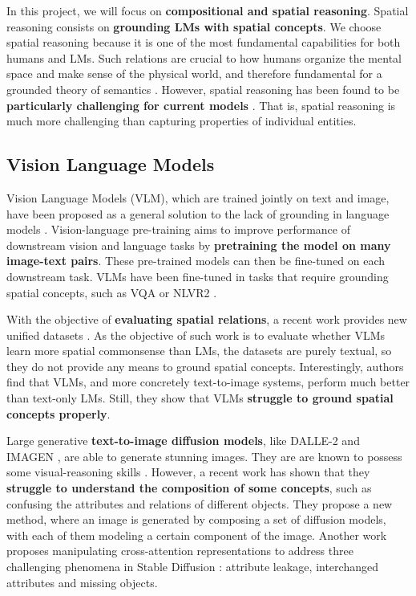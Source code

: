 In this project, we will focus on \textbf{compositional and spatial reasoning}. Spatial reasoning consists on \textbf{grounding LMs with spatial concepts}. We choose spatial reasoning because it is one of the most fundamental capabilities for both humans and LMs. Such relations are crucial to how humans organize the mental space and make sense of the physical world, and therefore fundamental for a grounded theory of semantics \cite{levinson2003space}. However, spatial reasoning has been found to be \textbf{particularly challenging for current models} \cite{akula2020words}. That is, spatial reasoning is much more challenging than capturing properties of individual entities.

\subsection{Vision Language Models} \label{sec:vision_language_models}

Vision Language Models (VLM), which are trained jointly on text and image, have been proposed as a general solution to the lack of grounding in language models \cite{lu2019vilbert, tan2020lxmert, ramesh2022hierarchical, saharia2022photorealistic}. Vision-language pre-training aims to improve performance of downstream vision and language tasks by \textbf{pretraining the model on many image-text pairs}. These pre-trained models can then be fine-tuned on each downstream task. VLMs have been fine-tuned in tasks that require grounding spatial concepts, such as VQA \cite{antol2015vqa} or NLVR2 \cite{suhr2018corpus}.

With the objective of \textbf{evaluating spatial relations}, a recent work provides new unified datasets \cite{liu2022things}. As the objective of such work is to evaluate whether VLMs learn more spatial commonsense than LMs, the datasets are purely textual, so they do not provide any means to ground spatial concepts. Interestingly, authors find that VLMs, and more concretely text-to-image systems, perform much better than text-only LMs. Still, they show that VLMs \textbf{struggle to ground spatial concepts properly}.

Large generative \textbf{text-to-image diffusion models}, like DALLE-2 \cite{ramesh2022hierarchical} and IMAGEN \cite{saharia2022photorealistic}, are able to generate stunning images. They are are known to possess some visual-reasoning skills \cite{cho2022dall}. However, a recent work \cite{liu2022compositional} has shown that they \textbf{struggle to understand the composition of some concepts}, such as confusing the attributes and relations of different objects. They propose a new method, where an image is generated by composing a set of diffusion models, with each of them modeling a certain component of the image. Another work \cite{anonymous2023trainingfree} proposes manipulating cross-attention representations to address three challenging phenomena in Stable Diffusion \cite{rombach2021highresolution}: attribute leakage, interchanged attributes and missing objects.

